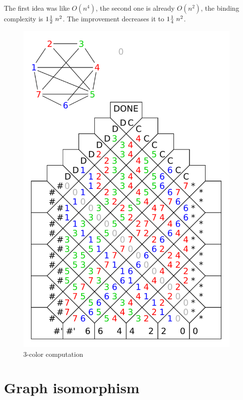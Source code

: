 The first idea was like $O(n^4)$, the second one is already $O(n^2)$, the binding complexity is $1\nicefrac{1}{2}\;n^2$. The improvement decreases it to $1\nicefrac{1}{4}\;n^2$.

\begin{figure}[h]
\begin{center}
	\includegraphics[scale=0.85]{./figures/3-color/3-color.pdf}
	\caption{3-color computation}
\end{center}
\end{figure}

\section{Graph isomorphism}

